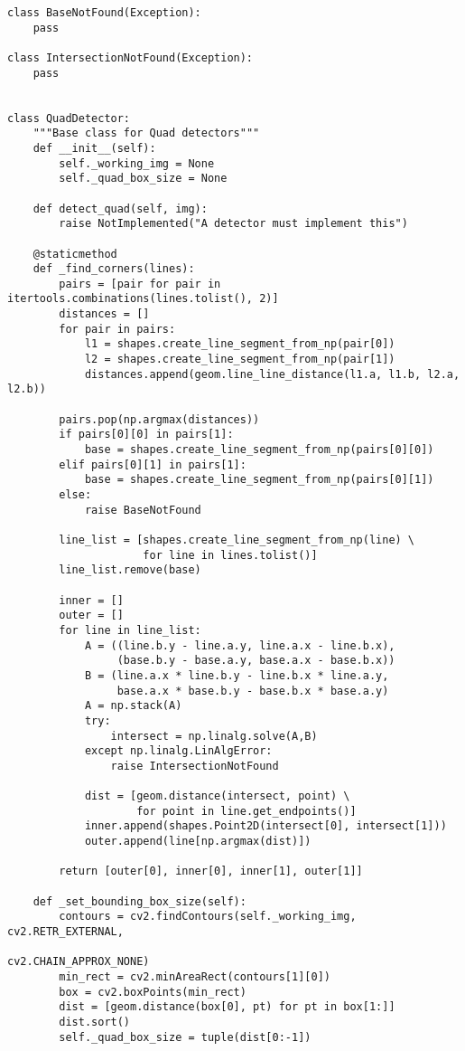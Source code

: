 \begin{verbatim}
class BaseNotFound(Exception):
    pass

class IntersectionNotFound(Exception):
    pass


class QuadDetector:
    """Base class for Quad detectors"""
    def __init__(self):
        self._working_img = None
        self._quad_box_size = None
    
    def detect_quad(self, img):
        raise NotImplemented("A detector must implement this")
    
    @staticmethod
    def _find_corners(lines):
        pairs = [pair for pair in itertools.combinations(lines.tolist(), 2)]
        distances = []
        for pair in pairs:
            l1 = shapes.create_line_segment_from_np(pair[0])
            l2 = shapes.create_line_segment_from_np(pair[1])
            distances.append(geom.line_line_distance(l1.a, l1.b, l2.a, l2.b))
        
        pairs.pop(np.argmax(distances))
        if pairs[0][0] in pairs[1]:
            base = shapes.create_line_segment_from_np(pairs[0][0])
        elif pairs[0][1] in pairs[1]:
            base = shapes.create_line_segment_from_np(pairs[0][1])
        else:
            raise BaseNotFound
        
        line_list = [shapes.create_line_segment_from_np(line) \ 
                     for line in lines.tolist()]
        line_list.remove(base)
        
        inner = []
        outer = []
        for line in line_list:
            A = ((line.b.y - line.a.y, line.a.x - line.b.x),
                 (base.b.y - base.a.y, base.a.x - base.b.x))
            B = (line.a.x * line.b.y - line.b.x * line.a.y,
                 base.a.x * base.b.y - base.b.x * base.a.y)
            A = np.stack(A)
            try:
                intersect = np.linalg.solve(A,B)
            except np.linalg.LinAlgError:
                raise IntersectionNotFound
        
            dist = [geom.distance(intersect, point) \ 
                    for point in line.get_endpoints()]
            inner.append(shapes.Point2D(intersect[0], intersect[1]))
            outer.append(line[np.argmax(dist)])
        
        return [outer[0], inner[0], inner[1], outer[1]]
    
    def _set_bounding_box_size(self):
        contours = cv2.findContours(self._working_img, cv2.RETR_EXTERNAL, 
                                                       cv2.CHAIN_APPROX_NONE)
        min_rect = cv2.minAreaRect(contours[1][0])
        box = cv2.boxPoints(min_rect)
        dist = [geom.distance(box[0], pt) for pt in box[1:]]
        dist.sort()
        self._quad_box_size = tuple(dist[0:-1])
\end{verbatim}

